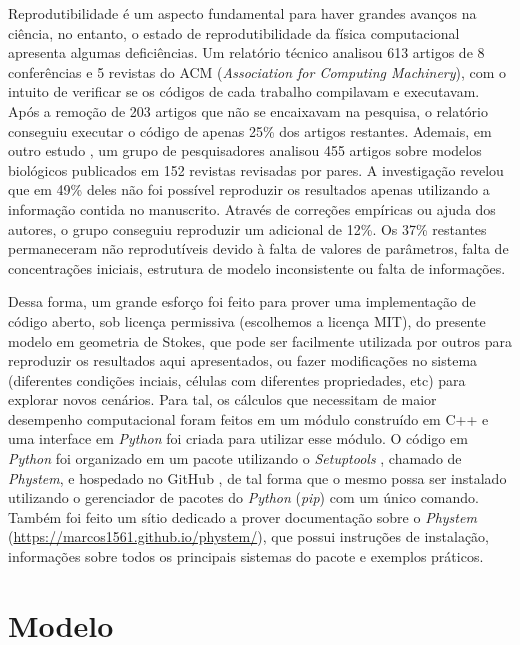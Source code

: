 \documentclass{article}
\theoremstyle{definition}
\begin{document}
Reprodutibilidade é um aspecto fundamental para haver grandes avanços na ciência, no entanto, o estado de reprodutibilidade da física computacional apresenta algumas deficiências. Um relatório técnico \cite{collberg_measuring_2014} analisou 613 artigos de 8 conferências e 5 revistas do ACM (\textit{Association for Computing Machinery}), com o intuito de verificar se os códigos de cada trabalho compilavam e executavam. Após a remoção de 203 artigos que não se encaixavam na pesquisa, o relatório conseguiu executar o código de apenas 25\% dos artigos restantes. Ademais, em outro estudo \cite{tiwari_reproducibility_2021}, um grupo de pesquisadores analisou 455 artigos sobre modelos biológicos publicados em 152 revistas revisadas por pares. A investigação revelou que em 49\% deles não foi possível reproduzir os resultados apenas utilizando a informação contida no manuscrito. Através de correções empíricas ou ajuda dos autores, o grupo conseguiu reproduzir um adicional de 12\%. Os 37\% restantes permaneceram não reprodutíveis devido à falta de valores de parâmetros, falta de concentrações iniciais, estrutura de modelo inconsistente ou falta de informações. 

Dessa forma, um grande esforço foi feito para prover uma implementação de código aberto, sob licença permissiva (escolhemos a licença MIT), do presente modelo em geometria de Stokes, que pode ser facilmente utilizada por outros para reproduzir os resultados aqui apresentados, ou fazer modificações no sistema (diferentes condições inciais, células com diferentes propriedades, etc) para explorar novos cenários. Para tal, os cálculos que necessitam de maior desempenho computacional foram feitos em um módulo construído em C++ e uma interface em \textit{Python} foi criada para utilizar esse módulo. O código em \textit{Python} foi organizado em um pacote utilizando o \textit{Setuptools} \cite{setuptools}, chamado de \textit{Phystem}, e hospedado no GitHub \cite{github}, de tal forma que o mesmo possa ser instalado utilizando o gerenciador de pacotes do \textit{Python} (\textit{pip}) com um único comando. Também foi feito um sítio dedicado a prover documentação sobre o \textit{Phystem} (\href{https://marcos1561.github.io/phystem/}{https://marcos1561.github.io/phystem/}), que possui instruções de instalação, informações sobre todos os principais sistemas do pacote e exemplos práticos.

\section{Modelo}
\end{document}
